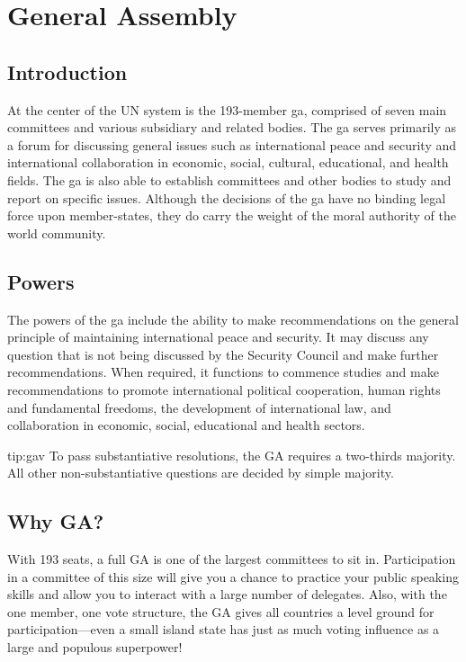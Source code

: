 \chapter{General Assembly}
\section{Introduction}
At the center of the UN system is the 193-member 
\acrfull{ga}, comprised of seven main committees and various 
subsidiary and related bodies. The \acrshort{ga} serves primarily as a forum for discussing general issues such as international peace and security and international collaboration in economic, social, cultural, educational, and health fields. The \acrshort{ga} is also able to establish committees and other bodies to study and report on specific issues. Although the decisions of the \acrshort{ga} have no binding legal force upon member-states, they do carry the weight of the moral authority of the world community.

\section{Powers}
The powers of the \acrshort{ga} include the ability to make 
recommendations on the general principle of maintaining 
international peace and security. It may discuss any question that 
is not being discussed by the Security Council and make further 
recommendations. When required, it functions to commence 
studies and make recommendations to promote international 
political cooperation, human rights and fundamental freedoms, 
the development of international law, and collaboration in 
economic, social, educational and health sectors.
\begin{tip}[GA Voting]{tip:gav}
To pass substantiative resolutions, the GA requires a two-thirds majority. \\
All other non-substantiative questions are decided by simple majority.
\end{tip}
\section{Why GA?}
With 193 seats, a full GA is one of the largest 
committees to sit in. Participation in a committee of this size 
will give you a chance to practice your public speaking skills and 
allow you to interact with a large number of delegates. Also, with 
the one member, one vote structure, the GA gives all countries a 
level ground for participation—even a small island state has just 
as much voting influence as a large and populous superpower!

